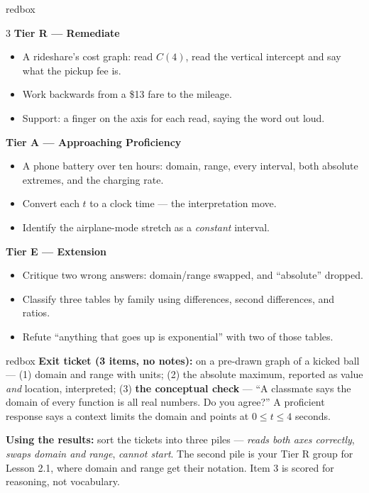 \documentclass[10pt]{article}
\begin{document}
\boxguard
\begin{skillbox}{redbox}
\begin{multicols}{3}
\textbf{Tier R --- Remediate}
\begin{itemize}[leftmargin=1em, itemsep=1pt, topsep=2pt]
  \item A rideshare's cost graph: read $C(4)$, read the vertical intercept and say what the
        pickup fee is.
  \item Work backwards from a \$13 fare to the mileage.
  \item Support: a finger on the axis for each read, saying the word out loud.
\end{itemize}

\columnbreak
\textbf{Tier A --- Approaching Proficiency}
\begin{itemize}[leftmargin=1em, itemsep=1pt, topsep=2pt]
  \item A phone battery over ten hours: domain, range, every interval, both absolute extremes,
        and the charging rate.
  \item Convert each $t$ to a clock time --- the interpretation move.
  \item Identify the airplane-mode stretch as a \emph{constant} interval.
\end{itemize}

\columnbreak
\textbf{Tier E --- Extension}
\begin{itemize}[leftmargin=1em, itemsep=1pt, topsep=2pt]
  \item Critique two wrong answers: domain/range swapped, and ``absolute'' dropped.
  \item Classify three tables by family using differences, second differences, and ratios.
  \item Refute ``anything that goes up is exponential'' with two of those tables.
\end{itemize}
\end{multicols}
\end{skillbox}

\begin{skillbox}{redbox}
\textbf{Exit ticket (3 items, no notes):} on a pre-drawn graph of a kicked ball ---
(1) domain and range with units; (2) the absolute maximum, reported as value \emph{and} location,
interpreted; (3) \textbf{the conceptual check} --- ``A classmate says the domain of every function
is all real numbers. Do you agree?'' A proficient response says a context limits the domain and
points at $0 \le t \le 4$ seconds.

\textbf{Using the results:} sort the tickets into three piles --- \emph{reads both axes
correctly}, \emph{swaps domain and range}, \emph{cannot start}. The second pile is your Tier R
group for Lesson 2.1, where domain and range get their notation. Item 3 is scored for reasoning,
not vocabulary.
\end{skillbox}
\end{document}

